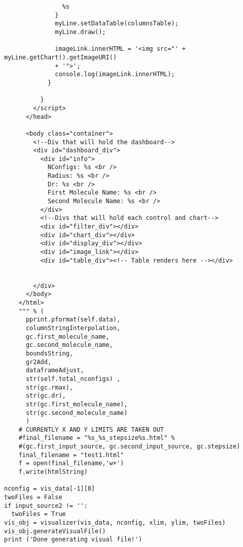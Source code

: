 \begin{verbatim}
                %s
              }
              myLine.setDataTable(columnsTable);
              myLine.draw();
              
              imageLink.innerHTML = '<img src="' + myLine.getChart().getImageURI() 
              + '">';
              console.log(imageLink.innerHTML);
            }
            
          }
        </script>
      </head>

      <body class="container">
        <!--Div that will hold the dashboard-->
        <div id="dashboard_div">
          <div id="info">
            NConfigs: %s <br /> 
            Radius: %s <br /> 
            Dr: %s <br />
            First Molecule Name: %s <br />
            Second Molecule Name: %s <br />
          </div>
          <!--Divs that will hold each control and chart-->
          <div id="filter_div"></div>
          <div id="chart_div"></div>
          <div id="display_div"></div>
          <div id="image_link"></div>
          <div id="table_div"><!-- Table renders here --></div>
          
          
        </div>
      </body>
    </html>
    """ % (
      pprint.pformat(self.data), 
      columnStringInterpolation,
      gc.first_molecule_name, 
      gc.second_molecule_name,
      boundsString,
      gr2Add,
      dataframeAdjust,
      str(self.total_nconfigs) , 
      str(gc.rmax), 
      str(gc.dr), 
      str(gc.first_molecule_name), 
      str(gc.second_molecule_name)
      )
    # CURRENTLY X AND Y LIMITS ARE TAKEN OUT
    #final_filename = "%s_%s_stepsize%s.html" % 
    #(gc.first_input_source, gc.second_input_source, gc.stepsize)
    final_filename = "test1.html"
    f = open(final_filename,'w+')
    f.write(htmlString)

nconfig = vis_data[-1][0]
twoFiles = False
if input_source2 != '':
  twoFiles = True
vis_obj = visualizer(vis_data, nconfig, xlim, ylim, twoFiles) 
vis_obj.generateVisualFile()
print ('Done generating visual file!')


\end{verbatim}